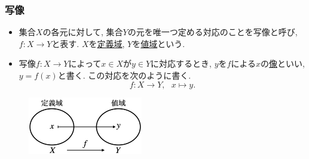\begin{frame}
\frametitle{写像}

\begin{Def} \label{写像定義}
\begin{itemize}
\item 集合$X$の各元に対して, 集合$Y$の元を唯一つ定める対応のことを写像と呼び, $f:X \rightarrow Y$と表す. 
$X$を\underline{定義域}, $Y$を\underline{値域}という. 
\item 写像$f:X\rightarrow Y$によって$x \in X$が$y\in Y$に対応するとき, $y$を$f$による$x$の\underline{像}といい, $y=f(x)$と書く. 
この対応を次のように書く. \vspace{-1mm}
$$
f:X \longrightarrow Y, \ \ \ x \mapsto y. 
$$
\end{itemize}
\end{Def}

\vspace{-1mm}

 \begin{figure}[htbp]
 \begin{center} 
  \includegraphics[width=50mm]{calculus1/map.png}
 \end{center}
\end{figure}

\vspace{-1mm}

\end{frame}





%
%
%
%
%
%
%


